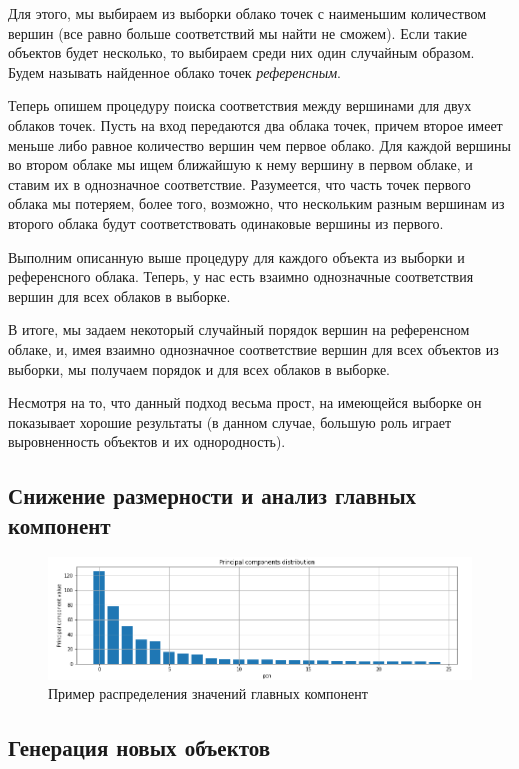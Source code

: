 Для этого, мы выбираем из выборки облако точек с наименьшим количеством вершин (все равно больше соответствий мы найти не сможем). Если такие объектов будет несколько, то выбираем среди них один случайным образом. Будем называть найденное облако точек \textit{референсным}.


Теперь опишем процедуру поиска соответствия между вершинами для двух облаков точек. Пусть на вход передаются два облака точек, причем второе имеет меньше либо равное количество вершин чем первое облако. Для каждой вершины во втором облаке мы ищем ближайшую к нему вершину в первом облаке, и ставим их в однозначное соответствие. Разумеется, что часть точек первого облака мы потеряем, более того, возможно, что нескольким разным вершинам из второго облака будут соответствовать одинаковые вершины из первого.


Выполним описанную выше процедуру для каждого объекта из выборки и референсного облака. Теперь, у нас есть взаимно однозначные соответствия вершин для всех облаков в выборке. 

В итоге, мы задаем некоторый случайный порядок вершин на референсном облаке, и, имея взаимно однозначное соответствие вершин для всех объектов из выборки, мы получаем порядок и для всех облаков в выборке.

Несмотря на то, что данный подход весьма прост, на имеющейся выборке он показывает хорошие результаты (в данном случае, большую роль играет выровненность объектов и их однородность).


\subsection{Снижение размерности и анализ главных компонент}

\begin{figure}[ht!]
    \includegraphics[width=1\linewidth]{images/pcd-example.png}
	\caption{Пример распределения значений главных компонент}
    \label{fig:pcd-ex}
\end{figure}


\subsection{Генерация новых объектов}


